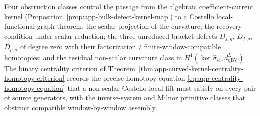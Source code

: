 \medskip
Four obstruction classes control the passage from the algebraic
coefficient-current kernel
(Proposition~\ref{prop:app-bulk-defect-kernel-map}) to a Costello
local-functional graph theorem: the scalar
projection of the curvature; the recovery condition under scalar
reduction; the three unreduced bracket defects \(D_{f,g}\), \(D_{f,\rho}\),
\(D_{\rho,\sigma}\) of degree zero with their factorization /
finite-window-compatible homotopies; and the residual non-scalar
curvature class in
\(H^1(\ker\widehat\sigma_{\mathrm{sc}},d_{\mathrm{qBV}}^L)\).  The
binary centrality criterion of
Theorem~\ref{thm:app-curved-kernel-centrality-homotopy-criterion}
records the precise homotopy equation \eqref{eq:app-centrality-homotopy-equation}
that a non-scalar Costello local lift must satisfy on every pair of
source generators, with the inverse-system and Milnor primitive
classes that obstruct compatible window-by-window assembly.

